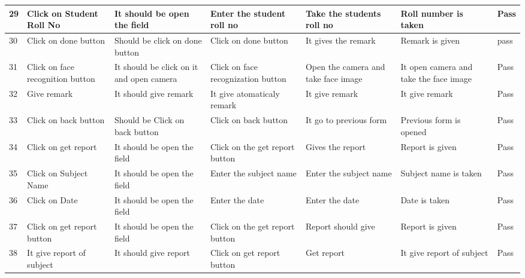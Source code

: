 \begin{center}
\begin{landscape}
\begin{longtable}{|p{1cm}|p{3.4cm}|p{4cm}|p{4cm}|p{3cm}|p{3cm}|p{1cm}|}
    29    & Click on Student Roll No & It  should be open the field & Enter the student roll no & Take the students roll no & Roll number is taken & Pass \\ \hline

    30    & Click on done button & Should be click on done button & Click on done button & It gives the remark & Remark is given & pass \\ \hline

    31    & Click on face recognition button & It should be click on it and open camera & Click on face recognization button & Open the camera and take face image & It open camera and take the face image & Pass \\ \hline

    32    & Give remark & It should give remark & It give  atomaticaly remark & It give remark & It give remark & Pass \\ \hline

    33    & Click on back button & Should be Click on back button & Click on back button & It go to previous form & Previous form is opened & Pass \\ \hline

    34    & Click on get report & It  should be open the field & Click on the get report button & Gives the report & Report is given & Pass \\ \hline

    35    & Click on Subject Name & It  should be open the field & Enter the subject name & Enter the subject name & Subject name is taken & Pass \\ \hline

    36    & Click on Date & It  should be open the field & Enter the date & Enter the date & Date is taken & Pass \\ \hline

    37    & Click on get report button & It  should be open the field & Click on the get report button & Report should give & Report is given & Pass \\ \hline

    38    & It give report of subject & It should give report & Click on get report button & Get report & It give report of subject & Pass \\ \hline

\end{longtable}
\end{landscape}
\end{center}







